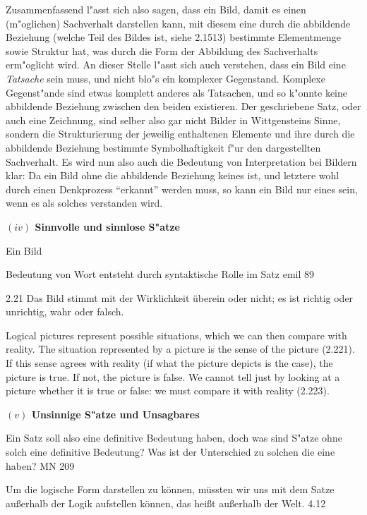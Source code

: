 \documentclass[a4paper, emulatestandardclasses, 12pt]{scrartcl}
\begin{document}
\begin{onehalfspace}
Zusammenfassend l"asst sich also sagen, dass ein Bild, damit es einen (m"oglichen) Sachverhalt darstellen kann, mit diesem eine durch die abbildende Beziehung (welche Teil des Bildes ist, siehe 2.1513) bestimmte Elementmenge sowie Struktur hat, was durch die Form der Abbildung des Sachverhalts erm"oglicht wird. An dieser Stelle l"asst sich auch verstehen, dass ein Bild eine \emph{Tatsache} sein muss, und nicht blo"s ein komplexer Gegenstand. Komplexe Gegenst"ande sind etwas komplett anderes als Tatsachen, und so k"onnte keine abbildende Beziehung zwischen den beiden existieren. Der geschriebene Satz, oder auch eine Zeichnung, sind selber also gar nicht Bilder in Wittgensteins Sinne, sondern die Strukturierung der jeweilig enthaltenen Elemente und ihre durch die abbildende Beziehung bestimmte Symbolhaftigkeit f"ur den dargestellten Sachverhalt. Es wird nun also auch die Bedeutung von Interpretation bei Bildern klar: Da ein Bild ohne die abbildende Beziehung keines ist, und letztere wohl durch einen Denkprozess "`erkannt"' werden muss, so kann ein Bild nur eines sein, wenn es als solches verstanden wird. 


\vspace{5mm}
\noindent\textbf{$(iv)$ Sinnvolle und sinnlose S"atze}	

Ein Bild 


Bedeutung von Wort entsteht durch syntaktische Rolle im Satz emil 89

2.21
Das Bild stimmt mit der Wirklichkeit überein oder nicht; es ist richtig oder unrichtig, wahr oder falsch.

Logical pictures represent possible situations, which we can then compare with reality. The situation represented by a picture is the sense of the picture (2.221). If this sense agrees with reality (if what the picture depicts is the case), the picture is true. If not, the picture is false. We cannot tell just by looking at a picture whether it is true or false: we must compare it with reality (2.223).



\vspace{5mm}
\noindent\textbf{$(v)$ Unsinnige S"atze und Unsagbares}	

Ein Satz soll also eine definitive Bedeutung haben, doch was sind S"atze ohne solch eine definitive Bedeutung? Was ist der Unterschied zu solchen die eine haben? MN 209

Um die logische Form darstellen zu können, müssten wir uns mit dem Satze außerhalb der Logik aufstellen können, das heißt außerhalb der Welt. 4.12


\end{onehalfspace}
\end{document}
